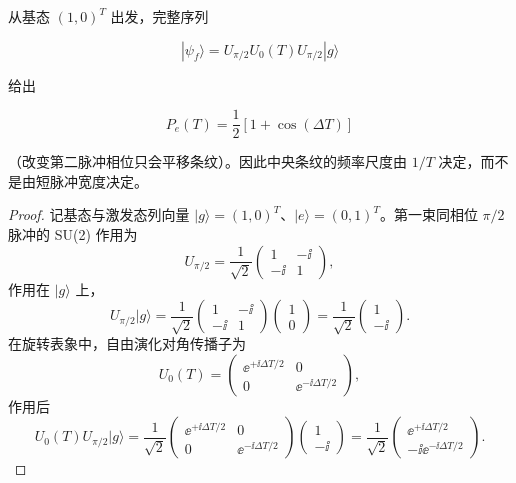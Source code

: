 从基态 \((1,0)^T\) 出发，完整序列

\[
|\psi_f\rangle
=U_{\pi/2}U_0(T)U_{\pi/2}|g\rangle
\]

给出

\[
P_e(T)=\frac12[1+\cos(\Delta T)]
\]

（改变第二脉冲相位只会平移条纹）。因此中央条纹的频率尺度由 \(1/T\) 决定，而不是由短脉冲宽度决定。

\begin{proof}
记基态与激发态列向量 $|g\rangle=(1,0)^T$、$|e\rangle=(0,1)^T$。第一束同相位 $\pi/2$ 脉冲的 SU(2) 作用为
\begin{equation*}
U_{\pi/2}=\frac1{\sqrt2}
\begin{pmatrix}1&-\ii\\-\ii&1\end{pmatrix},
\end{equation*}
作用在 $|g\rangle$ 上，
\begin{equation*}
U_{\pi/2}|g\rangle
=\frac1{\sqrt2}
\begin{pmatrix}1&-\ii\\-\ii&1\end{pmatrix}
\begin{pmatrix}1\\0\end{pmatrix}
=\frac1{\sqrt2}\begin{pmatrix}1\\-\ii\end{pmatrix}.
\end{equation*}
在旋转表象中，自由演化对角传播子为
\begin{equation*}
U_0(T)=
\begin{pmatrix}\ee^{+\ii\Delta T/2}&0\\0&\ee^{-\ii\Delta T/2}\end{pmatrix},
\end{equation*}
作用后
\begin{equation*}
U_0(T)U_{\pi/2}|g\rangle
=\frac1{\sqrt2}
\begin{pmatrix}\ee^{+\ii\Delta T/2}&0\\0&\ee^{-\ii\Delta T/2}\end{pmatrix}
\begin{pmatrix}1\\-\ii\end{pmatrix}
=\frac1{\sqrt2}
\begin{pmatrix}\ee^{+\ii\Delta T/2}\\-\ii\ee^{-\ii\Delta T/2}\end{pmatrix}.
\end{equation*}

\end{proof}
